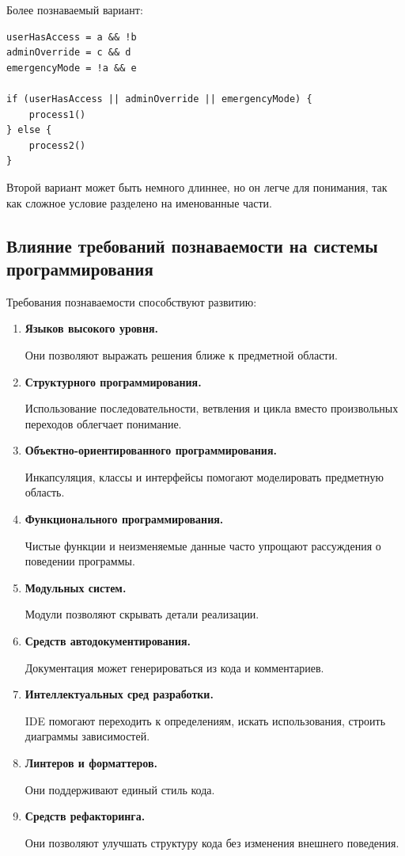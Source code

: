 \documentclass[12pt,a4paper]{article}
\begin{document}
Более познаваемый вариант:

\begin{verbatim}
userHasAccess = a && !b
adminOverride = c && d
emergencyMode = !a && e

if (userHasAccess || adminOverride || emergencyMode) {
    process1()
} else {
    process2()
}
\end{verbatim}

Второй вариант может быть немного длиннее, но он легче для понимания, так как сложное условие разделено на именованные части.

\subsection{Влияние требований познаваемости на системы программирования}

Требования познаваемости способствуют развитию:

\begin{enumerate}
    \item \textbf{Языков высокого уровня.}

    Они позволяют выражать решения ближе к предметной области.

    \item \textbf{Структурного программирования.}

    Использование последовательности, ветвления и цикла вместо произвольных переходов облегчает понимание.

    \item \textbf{Объектно-ориентированного программирования.}

    Инкапсуляция, классы и интерфейсы помогают моделировать предметную область.

    \item \textbf{Функционального программирования.}

    Чистые функции и неизменяемые данные часто упрощают рассуждения о поведении программы.

    \item \textbf{Модульных систем.}

    Модули позволяют скрывать детали реализации.

    \item \textbf{Средств автодокументирования.}

    Документация может генерироваться из кода и комментариев.

    \item \textbf{Интеллектуальных сред разработки.}

    IDE помогают переходить к определениям, искать использования, строить диаграммы зависимостей.

    \item \textbf{Линтеров и форматтеров.}

    Они поддерживают единый стиль кода.

    \item \textbf{Средств рефакторинга.}

    Они позволяют улучшать структуру кода без изменения внешнего поведения.
\end{enumerate}
\end{document}
